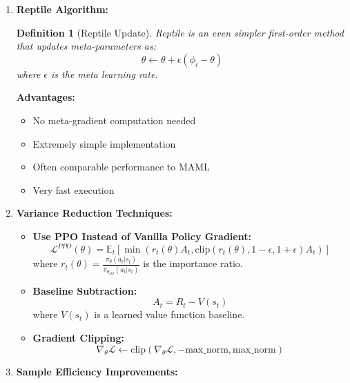 \documentclass[12pt]{article}
\newtheorem{definition}{Definition}
\begin{document}
{{\begin{enumerate}
				\item \textbf{Reptile Algorithm:}
				
				\begin{definition}[Reptile Update]
				Reptile is an even simpler first-order method that updates meta-parameters as:
				\begin{equation}
				\theta \leftarrow \theta + \epsilon(\phi_i - \theta)
				\end{equation}
				where $\epsilon$ is the meta learning rate.
				\end{definition}
				
				\textbf{Advantages:}
				\begin{itemize}
					\item No meta-gradient computation needed
					\item Extremely simple implementation
					\item Often comparable performance to MAML
					\item Very fast execution
				\end{itemize}
				
				\item \textbf{Variance Reduction Techniques:}
				
				\begin{itemize}
					\item \textbf{Use PPO Instead of Vanilla Policy Gradient:}
					\begin{equation}
					\mathcal{L}^{PPO}(\theta) = \mathbb{E}_t \left[ \min(r_t(\theta) A_t, \text{clip}(r_t(\theta), 1-\epsilon, 1+\epsilon) A_t) \right]
					\end{equation}
					where $r_t(\theta) = \frac{\pi_\theta(a_t|s_t)}{\pi_{\theta_{old}}(a_t|s_t)}$ is the importance ratio.
					
					\item \textbf{Baseline Subtraction:}
					\begin{equation}
					A_t = R_t - V(s_t)
					\end{equation}
					where $V(s_t)$ is a learned value function baseline.
					
					\item \textbf{Gradient Clipping:}
					\begin{equation}
					\nabla_\theta \mathcal{L} \leftarrow \text{clip}(\nabla_\theta \mathcal{L}, -\text{max\_norm}, \text{max\_norm})
					\end{equation}
				\end{itemize}
				
				\item \textbf{Sample Efficiency Improvements:}
				

\end{enumerate}}}
\end{document}
